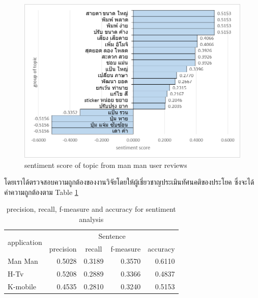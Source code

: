 \begin{figure}
	\centering
	\includegraphics[width=0.9\linewidth]{graphmanman}
	\caption{sentiment score of topic from man man user reviews}
	\label{fig:graphmanman}
\end{figure}

โดยเราได้ตรวจสอบความถูกต้องของงานวิจัยโดยให้ผู้เชี่ยวชาญประเมินทัศนคติของประโยค ซึ่งจะได้ค่าความถูกต้องตาม Table \ref{table:f-measureSenti}
\begin{table}
	\caption{precision, recall, f-measure and accuracy for sentiment analysis}
	\label{table:f-measureSenti}
	\centering
	\begin{tabular}{|l|r|r|r|r|}
		\hline
		\multicolumn{1}{|c|}{\multirow{2}{*}{application}} &
		\multicolumn{4}{|c|}{Sentence}\\
		\cline{2-5}
		\multicolumn{1}{|c|}{}&
		\multicolumn{1}{|c|}{precision}&
		\multicolumn{1}{|c|}{recall}&
		\multicolumn{1}{|c|}{f-measure} &
		\multicolumn{1}{|c|}{accuracy} \\
		\hline
		Man Man & 0.5028 & 0.3189 & 0.3570 & 0.6110\\
		\hline
		H-Tv & 0.5208 & 0.2889 & 0.3366 & 0.4837 \\
		\hline
		K-mobile & 0.4535 & 0.2810 & 0.3240 & 0.5153 \\
		\hline
	\end{tabular}
\end{table}

